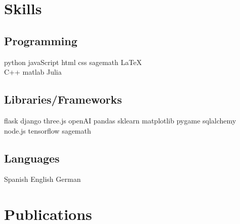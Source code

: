 \documentclass[]{plushcv}
\begin{document}
\begin{minipage}[t]{0.25\textwidth} 


\section{Skills}
\subsection{Programming}
python \textbullet{} javaScript  \textbullet{} html \textbullet{} css \textbullet{} sagemath \textbullet{} \LaTeX\ \\ 
{}
 C++ \textbullet{}  matlab \textbullet{} Julia %
 \sectionsep

 \subsection{Libraries/Frameworks}
flask \textbullet{} django \textbullet{} three.js \textbullet{} openAI \textbullet{} pandas \textbullet{} sklearn  \textbullet{} matplotlib \textbullet{} pygame \textbullet{}   sqlalchemy \textbullet{}  node.js  \textbullet{} tensorflow \textbullet{} sagemath\\
\sectionsep
\subsection{Languages}
Spanish \textbullet{} English \textbullet{} German 


\section{Publications}



\end{minipage}
\end{document}
